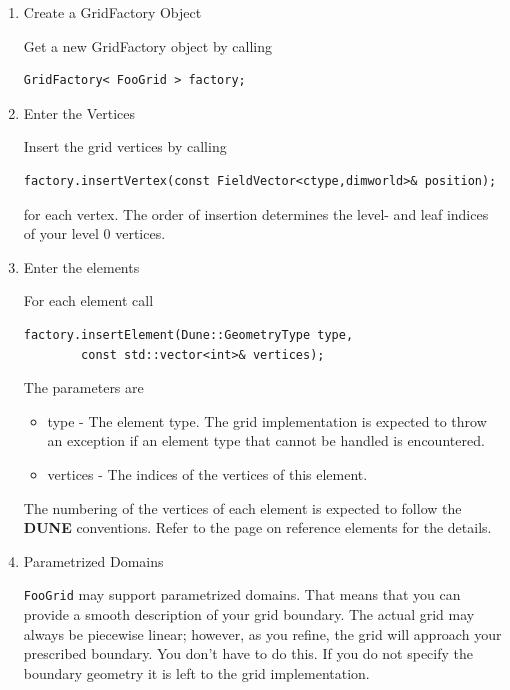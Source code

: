 \documentclass[11pt,a4paper,headinclude,footinclude,DIV16,normalheadings]{scrreprt}
\newcommand{\Dune}{{\sf\bfseries DUNE}\xspace}
\begin{document}
\begin{enumerate}
\item Create a GridFactory Object

Get a new GridFactory object by calling

\begin{lstlisting}[basicstyle=\small]
    GridFactory< FooGrid > factory;
\end{lstlisting}

\item Enter the Vertices

Insert the grid vertices by calling

\begin{lstlisting}[basicstyle=\small]
    factory.insertVertex(const FieldVector<ctype,dimworld>& position);
\end{lstlisting}

for each vertex. The order of insertion determines the level- and leaf indices of your level 0 vertices.

\item Enter the elements

For each element call

\begin{lstlisting}[basicstyle=\small]
    factory.insertElement(Dune::GeometryType type, 
        const std::vector<int>& vertices);
\end{lstlisting}

The parameters are

\begin{itemize}
    \item type - The element type. The grid implementation is expected to throw
	an exception if an element type that cannot be handled is encountered.
    \item vertices - The indices of the vertices of this element.
\end{itemize}

The numbering of the vertices of each element is expected to follow the \Dune
conventions. Refer to the page on reference elements for the details.

\item Parametrized Domains

\lstinline!FooGrid! may support parametrized domains. That means that you can provide a smooth description of your grid boundary. The actual grid may always be piecewise linear; however, as you refine, the grid will approach your prescribed boundary. You don't have to do this. If you do not specify the boundary geometry it is left to the grid implementation.


\end{enumerate}
\end{document}
